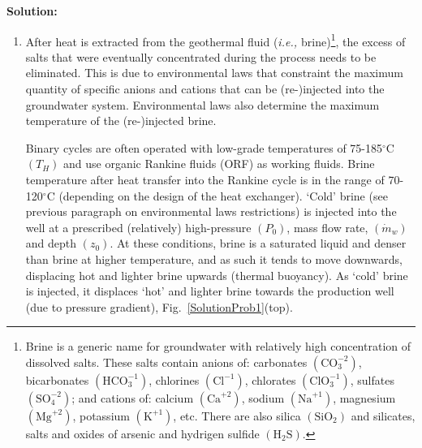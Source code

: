 \documentclass[12pts,a4paper,amsmath,amssymb,floatfix]{article}%
\newcommand{\ie}{{\em{i.e., }}}
\begin{document}
\begin{enumerate}[label=\bfseries Problem \arabic*:]
\clearpage

\noindent
    {\bf Solution:}
    \begin{enumerate}%
%
    \item After heat is extracted from the geothermal fluid (\ie brine)\footnote{Brine is a generic name for groundwater with relatively high concentration of dissolved salts. These salts contain anions of: carbonates $\left(\text{CO}_{3}^{-2}\right)$, bicarbonates $\left(\text{HCO}_{3}^{-1}\right)$, chlorines  $\left(\text{Cl}^{-1}\right)$, chlorates  $\left(\text{ClO}_{3}^{-1}\right)$, sulfates $\left(\text{SO}_{4}^{-2}\right)$; and cations of: calcium $\left(\text{Ca}^{+2}\right)$, sodium  $\left(\text{Na}^{+1}\right)$, magnesium  $\left(\text{Mg}^{+2}\right)$, potassium  $\left(\text{K}^{+1}\right)$, etc. There are also silica $\left(\text{SiO}_{2}\right)$ and silicates, salts and oxides of arsenic and hydrigen sulfide $\left(\text{H}_{2}\text{S}\right)$.}, the excess of salts that were eventually concentrated during the process needs to be eliminated. This is due to environmental laws that constraint the maximum quantity of specific anions and cations that can be (re-)injected into the groundwater system. Environmental laws also determine the maximum temperature of the (re-)injected brine.

      Binary cycles are often operated with low-grade temperatures of 75-185$^{\circ}$C $\left(T_{H}\right)$ and use organic Rankine fluids (ORF) as working fluids. Brine temperature after heat transfer into the Rankine cycle is in the range of 70-120$^{\circ}$C (depending on the design of the heat exchanger). `Cold' brine (see previous paragraph on environmental laws restrictions) is injected into the well at a prescribed (relatively) high-pressure $\left(P_{0}\right)$, mass flow rate, $\left(\dot{m}_{w}\right)$ and depth $\left(z_{0}\right)$. At these conditions, brine is a saturated liquid and denser than brine at higher temperature, and as such it tends to move downwards, displacing hot and lighter brine upwards (thermal buoyancy). As `cold' brine is injected, it displaces `hot' and lighter brine towards the production well (due to pressure gradient), Fig.~\ref{SolutionProb1}(top).


\end{enumerate}
\end{enumerate}
\end{document}
